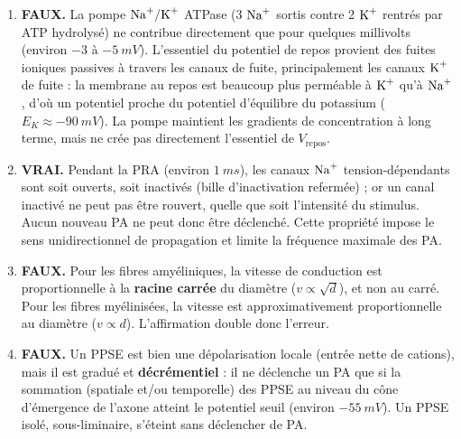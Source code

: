 \documentclass[11pt]{article}
\newcommand{\cle}[1]{{\popxbold\color{popdark}#1}}
\begin{document}
\begin{corrige}
\begin{enumerate}
    \item \textbf{FAUX.} La pompe $\ce{Na+/K+}$ ATPase (3 $\ce{Na+}$ sortis contre 2 $\ce{K+}$ rentrés par ATP hydrolysé) ne contribue directement que pour quelques millivolts (environ $-3$ à $-\SI{5}{mV}$). L'essentiel du potentiel de repos provient des \cle{fuites ioniques passives} à travers les canaux de fuite, principalement les canaux $\ce{K+}$ de fuite : la membrane au repos est beaucoup plus perméable à $\ce{K+}$ qu'à $\ce{Na+}$, d'où un potentiel proche du potentiel d'équilibre du potassium ($E_K \approx -\SI{90}{mV}$). La pompe maintient les gradients de concentration à long terme, mais ne crée pas directement l'essentiel de $V_{\text{repos}}$.
    \item \textbf{VRAI.} Pendant la PRA (environ $\SI{1}{ms}$), les canaux $\ce{Na+}$ tension-dépendants sont soit ouverts, soit \cle{inactivés} (bille d'inactivation refermée) ; or un canal inactivé ne peut pas être rouvert, quelle que soit l'intensité du stimulus. Aucun nouveau PA ne peut donc être déclenché. Cette propriété impose le sens unidirectionnel de propagation et limite la fréquence maximale des PA.
    \item \textbf{FAUX.} Pour les fibres amyéliniques, la vitesse de conduction est proportionnelle à la \textbf{racine carrée} du diamètre ($v \propto \sqrt{d}$), et non au carré. Pour les fibres myélinisées, la vitesse est approximativement proportionnelle au diamètre ($v \propto d$). L'affirmation double donc l'erreur.
    \item \textbf{FAUX.} Un PPSE est bien une dépolarisation locale (entrée nette de cations), mais il est \cle{gradué} et \textbf{décrémentiel} : il ne déclenche un PA que si la sommation (spatiale et/ou temporelle) des PPSE au niveau du cône d'émergence de l'axone atteint le potentiel seuil (environ $-\SI{55}{mV}$). Un PPSE isolé, sous-liminaire, s'éteint sans déclencher de PA.
\end{enumerate}
\end{corrige}
\end{document}
